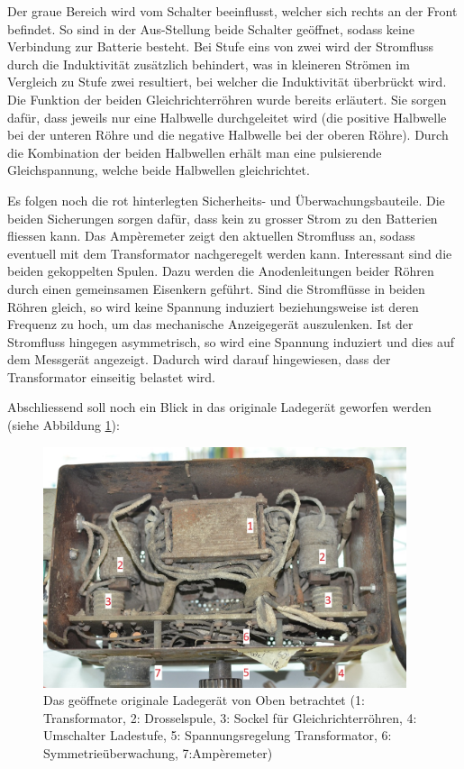 \newpage

Der graue Bereich wird vom Schalter beeinflusst, welcher sich rechts an der Front befindet. So sind in der Aus-Stellung beide Schalter geöffnet, sodass keine Verbindung zur Batterie besteht. Bei Stufe eins von zwei wird der Stromfluss durch die Induktivität zusätzlich behindert, was in kleineren Strömen im Vergleich zu Stufe zwei resultiert, bei welcher die Induktivität überbrückt wird. Die Funktion der beiden Gleichrichterröhren wurde bereits erläutert. Sie sorgen dafür, dass jeweils nur eine Halbwelle durchgeleitet wird (die positive Halbwelle bei der unteren Röhre und die negative Halbwelle bei der oberen Röhre). Durch die Kombination der beiden Halbwellen erhält man eine pulsierende Gleichspannung, welche beide Halbwellen gleichrichtet.

Es folgen noch die rot hinterlegten Sicherheits- und Überwachungsbauteile. Die beiden Sicherungen sorgen dafür, dass kein zu grosser Strom zu den Batterien fliessen kann. Das Ampèremeter zeigt den aktuellen Stromfluss an, sodass eventuell mit dem Transformator nachgeregelt werden kann. Interessant sind die beiden gekoppelten Spulen. Dazu werden die Anodenleitungen beider Röhren durch einen gemeinsamen Eisenkern geführt. Sind die Stromflüsse in beiden Röhren gleich, so wird keine Spannung induziert beziehungsweise ist deren Frequenz zu hoch, um das mechanische Anzeigegerät auszulenken. Ist der Stromfluss hingegen asymmetrisch, so wird eine Spannung induziert und dies auf dem Messgerät angezeigt. Dadurch wird darauf hingewiesen, dass der Transformator einseitig belastet wird.

Abschliessend soll noch ein Blick in das originale Ladegerät geworfen werden (siehe Abbildung \ref{fig:Ladegeraet_Original}):

\begin{figure}[h]
	\centering
		\includegraphics[width=0.95\textwidth]{images/Ladegeraet_Original.JPG}
	\caption{Das geöffnete originale Ladegerät von Oben betrachtet (1: Transformator, 2: Drosselspule, 3: Sockel für Gleichrichterröhren, 4: Umschalter Ladestufe, 5: Spannungsregelung Transformator, 6: Symmetrieüberwachung, 7:Ampèremeter)}
	\label{fig:Ladegeraet_Original}
\end{figure}

\newpage
